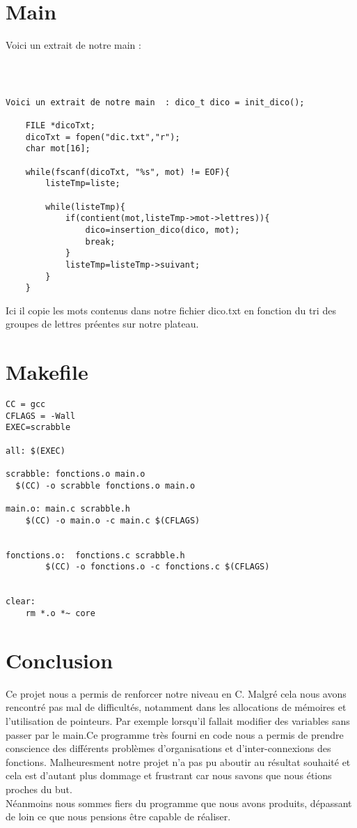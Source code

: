 \documentclass[a4paper]{article}
\begin{document}
\section{Main}

Voici un extrait de notre main :

\begin{verbatim}



Voici un extrait de notre main  : dico_t dico = init_dico();

	FILE *dicoTxt;
	dicoTxt = fopen("dic.txt","r");
	char mot[16];

	while(fscanf(dicoTxt, "%s", mot) != EOF){
		listeTmp=liste;

		while(listeTmp){
			if(contient(mot,listeTmp->mot->lettres)){
				dico=insertion_dico(dico, mot);
				break;
			}
			listeTmp=listeTmp->suivant;
		}
	}
\end{verbatim}

Ici il copie les mots contenus dans notre fichier dico.txt en fonction du tri des groupes de lettres préentes sur notre plateau.

\section{Makefile}


\begin{verbatim}
CC = gcc
CFLAGS = -Wall
EXEC=scrabble

all: $(EXEC)

scrabble: fonctions.o main.o
  $(CC) -o scrabble fonctions.o main.o

main.o: main.c scrabble.h
    $(CC) -o main.o -c main.c $(CFLAGS)


fonctions.o:  fonctions.c scrabble.h
        $(CC) -o fonctions.o -c fonctions.c $(CFLAGS)


clear:  
    rm *.o *~ core

\end{verbatim}


\color{red}
\section{Conclusion}

Ce projet nous a permis de renforcer notre niveau en C. Malgré cela nous avons rencontré pas mal de difficultés, notamment dans les allocations de mémoires et l'utilisation de pointeurs. Par exemple lorsqu'il fallait modifier des variables sans passer par le main.Ce programme très fourni en code nous a permis de prendre conscience des différents problèmes d'organisations et d'inter-connexions des fonctions. Malheuresment notre projet n'a pas pu aboutir au résultat souhaité et cela est d'autant plus dommage et frustrant car nous savons que nous étions proches du but.
\\
Néanmoins nous sommes fiers du programme que nous avons produits, dépassant de loin ce que nous pensions être capable de réaliser.
\end{document}
